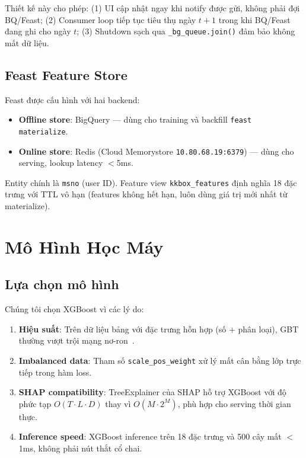 \documentclass[conference]{IEEEtran}
\begin{document}
Thiết kế này cho phép:
(1) UI cập nhật ngay khi notify được gửi, không phải đợi BQ/Feast;
(2) Consumer loop tiếp tục tiêu thụ ngày $t+1$ trong khi BQ/Feast đang ghi
cho ngày $t$;
(3) Shutdown sạch qua \texttt{\_bg\_queue.join()} đảm bảo không mất dữ liệu.

\subsection{Feast Feature Store}

Feast được cấu hình với hai backend:

\begin{itemize}
  \item \textbf{Offline store}: BigQuery — dùng cho training và backfill
        \texttt{feast materialize}.
  \item \textbf{Online store}: Redis (Cloud Memorystore \texttt{10.80.68.19:6379})
        — dùng cho serving, lookup latency $<$5ms.
\end{itemize}

Entity chính là \texttt{msno} (user ID). Feature view \texttt{kkbox\_features}
định nghĩa 18 đặc trưng với TTL vô hạn (features không hết hạn, luôn dùng
giá trị mới nhất từ materialize).

\section{Mô Hình Học Máy}
\label{sec:model}

\subsection{Lựa chọn mô hình}

Chúng tôi chọn XGBoost vì các lý do:

\begin{enumerate}
  \item \textbf{Hiệu suất}: Trên dữ liệu bảng với đặc trưng hỗn hợp (số + phân
        loại), GBT thường vượt trội mạng nơ-ron~\cite{grinsztajn2022tree}.
  \item \textbf{Imbalanced data}: Tham số \texttt{scale\_pos\_weight} xử lý
        mất cân bằng lớp trực tiếp trong hàm loss.
  \item \textbf{SHAP compatibility}: TreeExplainer của SHAP hỗ trợ XGBoost
        với độ phức tạp $O(T \cdot L \cdot D)$ thay vì $O(M \cdot 2^M)$,
        phù hợp cho serving thời gian thực.
  \item \textbf{Inference speed}: XGBoost inference trên 18 đặc trưng và
        500 cây mất $<$1ms, không phải nút thắt cổ chai.
\end{enumerate}
\end{document}
